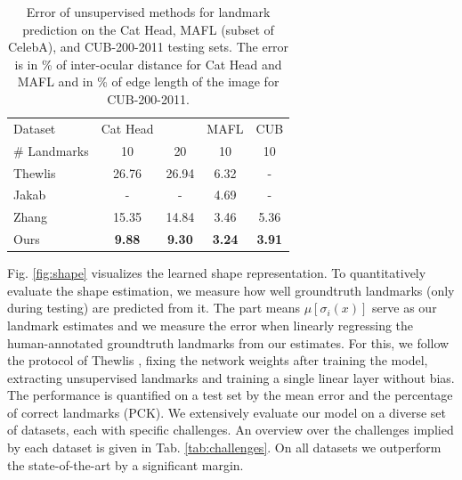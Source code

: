 	\begin{table}[t]
		\caption{{Error of unsupervised methods for landmark prediction on the Cat Head, MAFL (subset of CelebA), and CUB-200-2011 testing sets.
		The	error is in \% of inter-ocular distance for Cat Head and MAFL and in \% of edge length of the image for CUB-200-2011.}}
		\label{tab:static}
		\centering
		\begin{tabular}{l|cccc}
		\hline
		Dataset & Cat Head &  & MAFL & CUB\\
		  \# Landmarks &10 & 20  & 10 &10  \\
		  \hline
		 Thewlis \cite{thewlis17}
		 & 26.76 & 26.94 & 6.32  & -  \\
		 Jakab \cite{jakab18}
		 & - & - & 4.69 & - \\
		 Zhang \cite{zhang18}
		 & 15.35 & 14.84 & 3.46 & 5.36 \\
		  Ours & \textbf{9.88}  & \textbf{9.30} & \textbf{3.24} & \textbf{3.91}  \\ \hline  %
		\end{tabular}
	\end{table}

	Fig. \ref{fig:shape} visualizes the learned shape representation.
	To quantitatively evaluate the shape estimation, we measure how well groundtruth landmarks (only during testing) are predicted from it.
	The part means $\mu[\sigma_i(x)]$  serve as our landmark estimates and we measure the error when linearly regressing the human-annotated groundtruth landmarks from our estimates.
	For this, we follow the protocol of Thewlis \etal \cite{thewlis17}, fixing the network weights after training the model, extracting unsupervised landmarks and training a single linear layer without bias.
	The performance is quantified on a test set by the mean error and the percentage of correct landmarks (PCK).
	We extensively evaluate our model on a diverse set of datasets, each with specific challenges. An overview over the challenges implied by each dataset is given in Tab. \ref{tab:challenges}.
	On all datasets we outperform the state-of-the-art by a significant margin.

